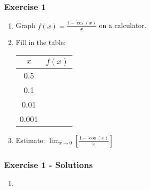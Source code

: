 \documentclass[12pt]{beamer}
\begin{document}
\begin{frame}
	\frametitle{Exercise 1}
	\initclock
	\large
	\begin{enumerate}
		\item Graph $f(x) = \frac{1-\cos(x)}{x}$ on a calculator.
		      \vspace*{\fill}
		      \vspace*{\fill}
		\item Fill in the table:
		      \small
		      \begin{table}[]
			      \begin{tabular}{c|c}
				      $x$   & $f(x)$ \\ \hline
				      0.5   &        \\
				      0.1   &        \\
				      0.01  &        \\
				      0.001 &
			      \end{tabular}
		      \end{table}
		      \large
		      \vspace*{\fill}
		      \vspace*{\fill}
		\item Estimate: $\displaystyle\lim_{x\to 0}\left[\frac{1-\cos(x)}{x}\right]$
	\end{enumerate}
	\vspace*{\fill}
	\vspace*{\fill}
	\vspace*{\fill}
	\vspace*{\fill}
	\crono
\end{frame}
\begin{frame}
	\frametitle{Exercise 1 - Solutions}
	\vspace*{\fill}
	\vspace*{\fill}
	\begin{enumerate}
		\item \begin{center}

		      \end{center}
	\end{enumerate}
	\vspace*{\fill}
	\vspace*{\fill}
	\vspace*{\fill}
	\vspace*{\fill}
\end{frame}
\end{document}
